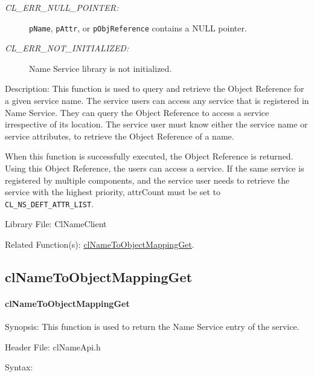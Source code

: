 \begin{flushleft}
\begin{Desc}
\begin{description}
\item[{\em CL\_\-ERR\_\-NULL\_\-POINTER:}]{\tt{pName}}, {\tt{pAttr}}, or {\tt{pObjReference}} contains a NULL pointer.
\item[{\em CL\_\-ERR\_\-NOT\_\-INITIALIZED:}]Name Service library is not initialized.\end{description}
\end{Desc}
\begin{Desc}
\item[Description:]This function is used to query and retrieve the Object Reference for a given service name. The service users can access any service 
that is registered in Name Service. They can query the Object Reference to access a service 
irrespective of its location. 
The service user must know either the service name or service attributes, to retrieve the Object Reference of a name. 
\par
When this function is successfully executed, the Object Reference is returned. Using this Object Reference, the users can access a service. If the same service 
is registered by multiple components, and the service user needs to retrieve the service with the highest priority, attrCount must be set to 
{\tt{CL\_\-NS\_\-DEFT\_\-ATTR\_\-LIST}}. 
\end{Desc}
\begin{Desc}
\item[Library File:]Cl\-Name\-Client\end{Desc}
\begin{Desc}
\item[Related Function(s):]\hyperlink{pagens109}{cl\-Name\-To\-Object\-Mapping\-Get}. \end{Desc}
\newpage


\subsection{clNameToObjectMappingGet}
\hypertarget{pagens109}{}\paragraph{cl\-Name\-To\-Object\-Mapping\-Get}\label{pagens109}
\begin{Desc}
\item[Synopsis:]This function is used to return the Name Service entry of the service. \end{Desc}
\begin{Desc}
\item[Header File:]clNameApi.h\end{Desc}
\begin{Desc}
\item[Syntax:]


\end{Desc}
\end{flushleft}
